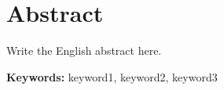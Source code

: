 \chapter*{Abstract}

\begin{center}
  {\large\bfseries \ThesisTitleEn\par}
  \vspace{3mm}
  \AuthorEn\par
\end{center}

Write the English abstract here.

\vspace{5mm}
\noindent\textbf{Keywords:} keyword1, keyword2, keyword3
